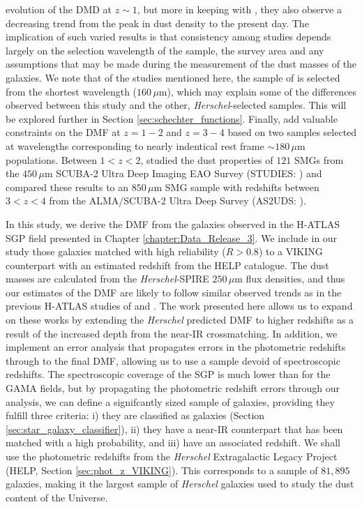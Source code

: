 evolution of the DMD at $z \sim 1$, but more in keeping with \citealt{Dunne_2011}, they also observe a decreasing trend from the peak in dust density to the present day. The implication of such varied results is that consistency among studies depends largely on the selection wavelength of the sample, the survey area and any assumptions that may be made during the measurement of the dust masses of the galaxies. We note that of the studies mentioned here, the sample of \citealt{Pozzi_2020} is selected from the shortest wavelength ($160\,\mu$m), which may explain some of the differences observed between this study and the other, \textit{Herschel}-selected samples. This will be explored further in Section \ref{sec:schechter_functions}. Finally, \citealt{Dudzeviciute_2021} add valuable constraints on the DMF at $z = 1 - 2$ and $z = 3 - 4$ based on two samples selected at wavelengths corresponding to nearly indentical rest frame $\sim 180\,\mu$m populations. Between $1 < z < 2$, \citealt{Dudzeviciute_2021} studied the dust properties of $121$ SMGs from the $450\,\mu$m SCUBA-2 Ultra Deep Imaging EAO Survey (STUDIES: \citealt{Wang_2017, Chang_2018, Lim_2020b, Lim_2020c}) and compared these results to an $850\,\mu$m SMG sample with redshifts between $3 < z < 4$ from the ALMA/SCUBA-2 Ultra Deep Survey (AS2UDS: \citealt{Stach_2018, Stach_2019, Dudzeviciute_2020}). 

In this study, we derive the DMF from the galaxies observed in the H-ATLAS SGP field presented in Chapter \ref{chapter:Data_Release_3}. We include in our study those galaxies matched with high reliability ($R > 0.8$) to a VIKING counterpart with an estimated redshift from the HELP catalogue. The dust masses are calculated from the \textit{Herschel}-SPIRE $250\,\mu$m flux densities, and thus our estimates of the DMF are likely to follow similar observed trends as in the previous H-ATLAS studies of \citealt{Dunne_2011} and \citealt{Beeston_2018}. The work presented here allows us to expand on these works by extending the \textit{Herschel} predicted DMF to higher redshifts as a result of the increased depth from the near-IR crossmatching. In addition, we implement an error analysis that propagates errors in the photometric redshifts through to the final DMF, allowing us to use a sample devoid of spectroscopic redshifts. The spectroscopic coverage of the SGP is much lower than for the GAMA fields, but by propagating the photometric redshift errors through our analysis, we can define a signifcantly sized sample of galaxies, providing they fulfill three criteria: i) they are classified as galaxies (Section \ref{sec:star_galaxy_classifier}), ii) they have a near-IR counterpart that has been matched with a high probability, and iii) have an associated redshift. We shall use the photometric redshifts from the \textit{Herschel} Extragalactic Legacy Project (HELP, Section \ref{sec:phot_z_VIKING}). This corresponds to a sample of $81,895$ galaxies, making it the largest sample of \textit{Herschel} galaxies used to study the dust content of the Universe.

